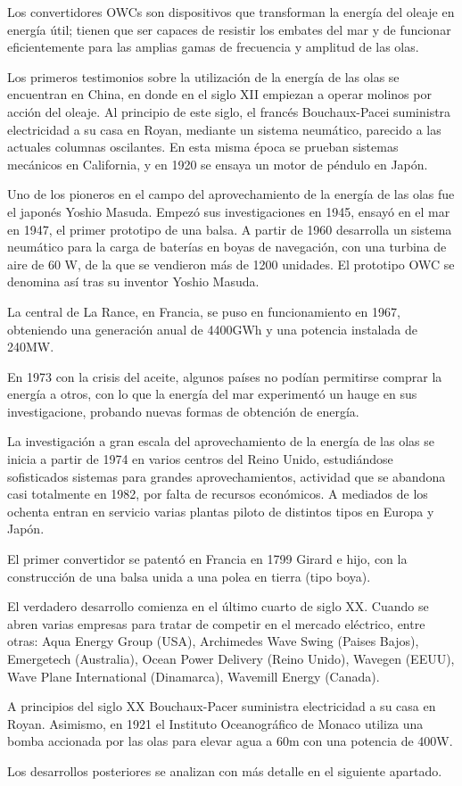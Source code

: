 Los convertidores OWCs son dispositivos que transforman la energía del
oleaje en energía útil; tienen que ser capaces de resistir los embates
del mar y de funcionar eficientemente para las amplias gamas de
frecuencia y amplitud de las olas.

Los primeros testimonios sobre la utilización de la energía de las olas
se encuentran en China, en donde en el siglo XII empiezan a operar
molinos por acción del oleaje. Al principio de este siglo, el francés
Bouchaux-Pacei suministra electricidad a su casa en Royan, mediante un
sistema neumático, parecido a las actuales columnas oscilantes. En esta
misma época se prueban sistemas mecánicos en California, y en 1920 se
ensaya un motor de péndulo en Japón.

Uno de los pioneros en el campo del aprovechamiento de la energía de las
olas fue el japonés Yoshio Masuda. Empezó sus investigaciones en 1945,
ensayó en el mar en 1947, el primer prototipo de una balsa. A partir de
1960 desarrolla un sistema neumático para la carga de baterías en boyas
de navegación, con una turbina de aire de 60 W, de la que se vendieron
más de 1200 unidades. El prototipo OWC se denomina así tras su inventor
Yoshio Masuda.

La central de La Rance, en Francia, se puso en funcionamiento en 1967,
obteniendo una generación anual de 4400GWh y una potencia instalada de
240MW.

En 1973 con la crisis del aceite, algunos países no podían permitirse
comprar la energía a otros, con lo que la energía del mar experimentó un
hauge en sus investigacione, probando nuevas formas de obtención de
energía.

La investigación a gran escala del aprovechamiento de la energía de las
olas se inicia a partir de 1974 en varios centros del Reino Unido,
estudiándose sofisticados sistemas para grandes aprovechamientos,
actividad que se abandona casi totalmente en 1982, por falta de recursos
económicos. A mediados de los ochenta entran en servicio varias plantas
piloto de distintos tipos en Europa y Japón.

El primer convertidor se patentó en Francia en 1799 Girard e hijo, con
la construcción de una balsa unida a una polea en tierra (tipo boya).

El verdadero desarrollo comienza en el último cuarto de siglo XX. Cuando
se abren varias empresas para tratar de competir en el mercado
eléctrico, entre otras: Aqua Energy Group (USA), Archimedes Wave Swing
(Paises Bajos), Emergetech (Australia), Ocean Power Delivery (Reino
Unido), Wavegen (EEUU), Wave Plane International (Dinamarca), Wavemill
Energy (Canada).

A principios del siglo XX Bouchaux-Pacer suministra electricidad a su
casa en Royan. Asimismo, en 1921 el Instituto Oceanográfico de Monaco
utiliza una bomba accionada por las olas para elevar agua a 60m con una
potencia de 400W.

Los desarrollos posteriores se analizan con más detalle en el siguiente apartado.
